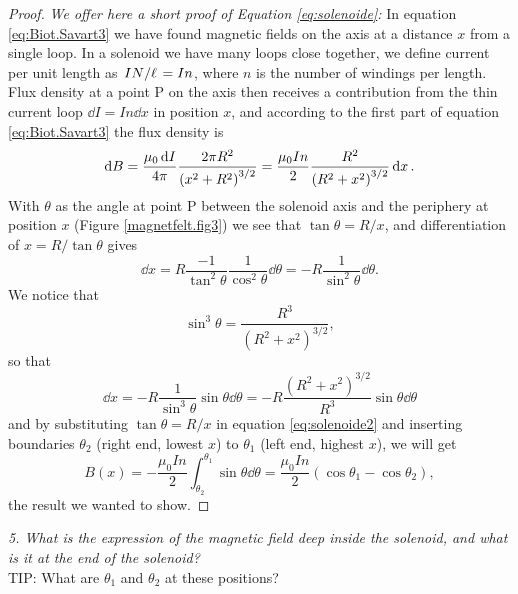 \documentclass[../Elmag-labhefte-2020.tex]{subfiles}
\begin{document}
\begin{proof}
  \emph{We offer here a short proof of Equation \eqref{eq:solenoide}:} In equation \eqref{eq:Biot.Savart3} we have found magnetic fields on the axis at a distance $x$ from a single loop. In a solenoid we have many loops close together, we define current per unit length as $\flatfrac{I N}{\ell} = I n$, where $n$ is the number of windings per length. Flux density at a point P on the axis then receives a contribution from the thin current loop $\dd{I} = I n \dd{x}$ in position $x$, and according to the first part of equation \eqref{eq:Biot.Savart3} the flux density is 
  \begin{equation}
    \dd B 
    = \frac{\mu_0 \dd{I}}{4 \pi} \frac{2\pi R^2}{\qty(x^2 + R^2)^{3/2}}
    = \frac{\mu_0 I n}{2}  \frac{R^2}{ \qty( R^2 + x^2)^{3/2}} \dd{x} .
    \label{eq:solenoide2}
  \end{equation}
  With $\theta$ as the angle at point P between the solenoid axis and the periphery at position $x$ (Figure \ref{magnetfelt.fig3}) we see that $\tan \theta = R / x$, and differentiation of $x = R / \tan \theta$ gives
  \begin{equation}
    \dd{x} 
    = R \frac{-1}{\tan^2 \theta} \frac{1}{\cos^2\theta} \dd{\theta} 
    = -R \frac{1}{\sin^2\theta} \dd{\theta} .
  \end{equation}
  We notice that
  \begin{equation}
    \sin^3 \theta = \frac{R^3}{(R^2 + x^2)^{3/2}},
  \end{equation}
  so that
  \begin{equation}
    \dd{x} 
    = -R \frac{1}{\sin^3\theta} \sin\theta \dd{\theta}
    = -R \frac{(R^2 + x^2)^{3/2}}{R^3} \sin\theta \dd{\theta}
  \end{equation}
  and by substituting $\tan \theta = R / x$ in equation \eqref{eq:solenoide2} and inserting boundaries $\theta_2$ (right end, lowest $x$) to $\theta_1$ (left end, highest $x$), we will get
  \begin{equation}
    B(x) 
    = -\frac{\mu_0 I n}{2} \int_{\theta_2}^{\theta_1} \sin \theta \dd{\theta}
    = \frac{\mu_0 I n}{2} (\cos \theta_1 - \cos \theta_2),
    \label{eq:solenoide3}
  \end{equation}
  the result we wanted to show.
\end{proof}

\emph{5. What is the expression of the magnetic field deep inside the solenoid, and what is it at the end of the solenoid?}
\\
TIP: What are $\theta_1$ and $\theta_2$ at these positions?
\end{document}
